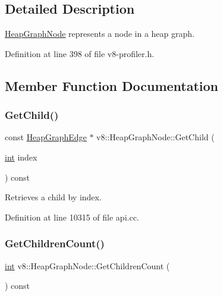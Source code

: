 \subsection{Detailed Description}
\mbox{\hyperlink{classv8_1_1HeapGraphNode}{Heap\+Graph\+Node}} represents a node in a heap graph. 

Definition at line 398 of file v8-\/profiler.\+h.



\subsection{Member Function Documentation}
\mbox{\label{classv8_1_1HeapGraphNode_ad3a8d2b97d9ffbdafc5c0b23f20427cf}} 
\subsubsection{\texorpdfstring{Get\+Child()}{GetChild()}}
{\footnotesize\ttfamily const \mbox{\hyperlink{classv8_1_1HeapGraphEdge}{Heap\+Graph\+Edge}} $\ast$ v8\+::\+Heap\+Graph\+Node\+::\+Get\+Child (\begin{DoxyParamCaption}\item[{\mbox{\hyperlink{classint}{int}}}]{index }\end{DoxyParamCaption}) const}

Retrieves a child by index. 

Definition at line 10315 of file api.\+cc.

\mbox{\label{classv8_1_1HeapGraphNode_afb0afb27e5d5ae27b54376bc69f095ae}} 
\subsubsection{\texorpdfstring{Get\+Children\+Count()}{GetChildrenCount()}}
{\footnotesize\ttfamily \mbox{\hyperlink{classint}{int}} v8\+::\+Heap\+Graph\+Node\+::\+Get\+Children\+Count (\begin{DoxyParamCaption}{ }\end{DoxyParamCaption}) const}

